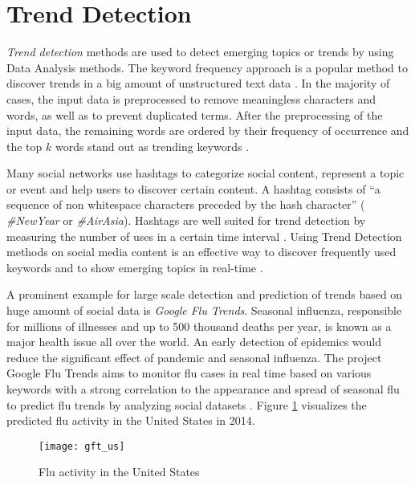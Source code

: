 \section{Trend Detection}
\label{sec:trends}
\textit{Trend detection} methods are used to detect emerging topics or trends by using Data Analysis methods. The keyword frequency approach is a popular method to discover trends in a big amount of unstructured text data \cite{journals/smarthome/Kim+13}. In the majority of cases, the input data is preprocessed to remove meaningless characters and words, as well as to prevent duplicated terms. After the preprocessing of the input data, the remaining words are ordered by their frequency of occurrence and the top $k$ words stand out as trending keywords \cite[213\psq]{journals/smarthome/Kim+13}.

Many social networks use hashtags to categorize social content, represent a topic or event and help users to discover certain content. A hashtag consists of \enquote{a sequence of non whitespace characters preceded by the hash character} \cites[644]{conf/wsdm/TsurR12}[1427]{conf/wsdm/TsurR12,conf/asunam/ZhangWL13} (\eg{} \textit{\#NewYear} or \textit{\#AirAsia}). Hashtags are well suited for trend detection by measuring the number of uses in a certain time interval \cite[1427]{conf/asunam/ZhangWL13}. Using Trend Detection methods on social media content is an effective way to discover frequently used keywords and to show emerging topics in real-time \cite{journals/smarthome/Kim+13,TwitterDataAnalytics2013}.

A prominent example for large scale detection and prediction of trends based on huge amount of social data is \textit{Google Flu Trends}. Seasonal influenza, responsible for millions of illnesses and up to 500 thousand deaths per year, is known as a major health issue all over the world. An early detection of epidemics would reduce the significant effect of pandemic and seasonal influenza. The project Google Flu Trends aims to monitor flu cases in real time based on various keywords with a strong correlation to the appearance and spread of seasonal flu to predict flu trends by analyzing social datasets \cites{Google09detection}[1]{Weber2014,Tech22014}. Figure \ref{fig:use_case_gft} visualizes the predicted flu activity in the United States in 2014.

\begin{figure}[H]
  \centering
        \texttt{[image: gft\_us]}
  \caption[Flu activity in the United States]{Flu activity in the United States \cite{gft2014}}
  \label{fig:use_case_gft}
  \vspace{-1.3em}
\end{figure}
